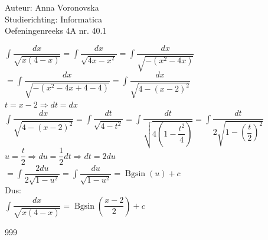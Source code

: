 \documentclass[a4paper]{article}
\begin{document}
  
\noindent \large Auteur: Anna Voronovska \\
\noindent \large Studierichting: Informatica\\
\noindent \large Oefeningenreeks 4A nr. 40.1\\

\medskip

\normalsize


$\displaystyle\int \dfrac{dx}{\sqrt{x(4-x)}}= \displaystyle\int \dfrac{dx}{\sqrt{4x - x^2}} =\displaystyle\int \dfrac{dx}{\sqrt{-(x^2 - 4x)}}$\\

$= \displaystyle\int \dfrac{dx}{\sqrt{-(x^2 - 4x + 4 - 4)}} =\displaystyle\int \dfrac{dx}{\sqrt{4 - (x-2)^2}} $\\

$t = x-2 \Rightarrow dt = dx$\\

$\displaystyle\int \dfrac{dx}{\sqrt{4-(x-2)^2}} = \displaystyle\int \dfrac{dt}{\sqrt{4-t^2}} = \displaystyle\int \dfrac{dt}{\sqrt{4\left(1-\dfrac{t^2}{4}\right)}} = \displaystyle\int \dfrac{dt}{2\sqrt{1-\left(\dfrac{t}{2}\right)^2}}$\\

$u = \dfrac{t}{2} \Rightarrow du = \dfrac{1}{2}dt \Rightarrow dt = 2du$\\

$= \displaystyle\int \dfrac{2du}{2\sqrt{1-u^2}} = \displaystyle\int \dfrac{du}{\sqrt{1-u^2}} = \operatorname{Bgsin}(u) + c$\\

Dus:\\

$\displaystyle\int \dfrac{dx}{\sqrt{x(4-x)}} = \operatorname{Bgsin}\left(\dfrac{x-2}{2}\right) + c$





\begin{thebibliography}{999}
\end{thebibliography}
\end{document}

